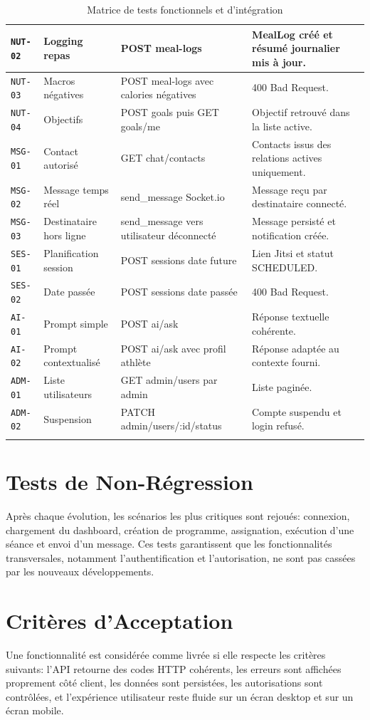 \begin{longtable}{|p{2.2cm}|p{4cm}|p{5.2cm}|p{5cm}|}
\texttt{NUT-02} & Logging repas & POST meal-logs & MealLog créé et résumé journalier mis à jour. \\ \hline
\texttt{NUT-03} & Macros négatives & POST meal-logs avec calories négatives & 400 Bad Request. \\ \hline
\texttt{NUT-04} & Objectifs & POST goals puis GET goals/me & Objectif retrouvé dans la liste active. \\ \hline
\texttt{MSG-01} & Contact autorisé & GET chat/contacts & Contacts issus des relations actives uniquement. \\ \hline
\texttt{MSG-02} & Message temps réel & send\_message Socket.io & Message reçu par destinataire connecté. \\ \hline
\texttt{MSG-03} & Destinataire hors ligne & send\_message vers utilisateur déconnecté & Message persisté et notification créée. \\ \hline
\texttt{SES-01} & Planification session & POST sessions date future & Lien Jitsi et statut SCHEDULED. \\ \hline
\texttt{SES-02} & Date passée & POST sessions date passée & 400 Bad Request. \\ \hline
\texttt{AI-01} & Prompt simple & POST ai/ask & Réponse textuelle cohérente. \\ \hline
\texttt{AI-02} & Prompt contextualisé & POST ai/ask avec profil athlète & Réponse adaptée au contexte fourni. \\ \hline
\texttt{ADM-01} & Liste utilisateurs & GET admin/users par admin & Liste paginée. \\ \hline
\texttt{ADM-02} & Suspension & PATCH admin/users/:id/status & Compte suspendu et login refusé. \\ \hline
\caption{Matrice de tests fonctionnels et d'intégration}
\end{longtable}

\section{Tests de Non-Régression}
Après chaque évolution, les scénarios les plus critiques sont rejoués: connexion, chargement du dashboard, création de programme, assignation, exécution d'une séance et envoi d'un message. Ces tests garantissent que les fonctionnalités transversales, notamment l'authentification et l'autorisation, ne sont pas cassées par les nouveaux développements.

\section{Critères d'Acceptation}
Une fonctionnalité est considérée comme livrée si elle respecte les critères suivants: l'API retourne des codes HTTP cohérents, les erreurs sont affichées proprement côté client, les données sont persistées, les autorisations sont contrôlées, et l'expérience utilisateur reste fluide sur un écran desktop et sur un écran mobile.

